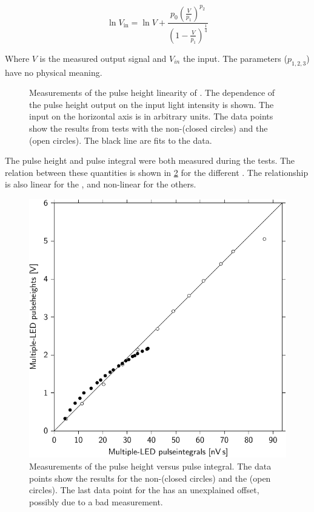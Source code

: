 \begin{equation}
    \ln V_{\mathrm{in}} = \ln V +
                          \frac{p_0 \left(\frac{V}{p_1}\right)^{p_2}}
                               {\left(1 - \frac{V}{p_1}\right)^{\frac{1}{4}}}
\end{equation}

Where $V$ is the measured output signal and $V_{in}$ the input. The parameters ($p_{1,2,3}$) have no physical meaning.

\begin{figure}
    \centering
    
    \caption{Measurements of the pulse height linearity of \pmts. The dependence of the pulse height output on the input light intensity is shown. The input on the horizontal axis is in arbitrary units. The data points show the results from tests with the non-\nikhef \pmt (closed circles) and the \nikhef \pmt (open circles). The black line are fits to the data.}
    \label{fig:linearity_pmts}
\end{figure}

The pulse height and pulse integral were both measured during the tests. The relation between these quantities is shown in \cref{fig:ph_pi_compared_nikhef_senstech} for the different \pmts. The relationship is also linear for the \nikhef \pmt, and non-linear for the others.

\begin{figure}
    \centering
    \includegraphics[width=.7\linewidth]
                    {plots/detector/ph_pi_compared_nikhef_senstech}
    \caption{Measurements of the pulse height versus pulse integral. The data points show the results for the non-\nikhef \pmt (closed circles) and the \nikhef \pmt (open circles). The last data point for the \nikhef \pmt has an unexplained offset, possibly due to a bad measurement.}
    \label{fig:ph_pi_compared_nikhef_senstech}
\end{figure}

